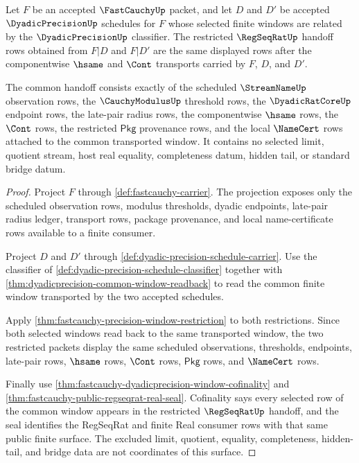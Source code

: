 \begin{theorem}
\label{thm:fastcauchy-shared-window-regseqrat-handoff}
Let $F$ be an accepted $\FastCauchyUp$ packet, and let $D$ and $D'$ be accepted
$\DyadicPrecisionUp$ schedules for $F$ whose selected finite windows are
related by the $\DyadicPrecisionUp$ classifier. The restricted
$\RegSeqRatUp$ handoff rows obtained from $F|D$ and $F|D'$ are the same
displayed rows after the componentwise $\hsame$ and $\Cont$ transports carried
by $F$, $D$, and $D'$.

The common handoff consists exactly of the scheduled $\StreamNameUp$
observation rows, the $\CauchyModulusUp$ threshold rows, the
$\DyadicRatCoreUp$ endpoint rows, the late-pair radius rows, the componentwise
$\hsame$ rows, the $\Cont$ rows, the restricted $\mathsf{Pkg}$ provenance
rows, and the local $\NameCert$ rows attached to the common transported window.
It contains no selected limit, quotient stream, host real equality,
completeness datum, hidden tail, or standard bridge datum.
\end{theorem}
\begin{proof}
Project $F$ through \autoref{def:fastcauchy-carrier}. The projection exposes
only the scheduled observation rows, modulus thresholds, dyadic endpoints,
late-pair radius ledger, transport rows, package provenance, and local
name-certificate rows available to a finite consumer.

Project $D$ and $D'$ through
\autoref{def:dyadic-precision-schedule-carrier}. Use the classifier of
\autoref{def:dyadic-precision-schedule-classifier} together with
\autoref{thm:dyadicprecision-common-window-readback} to read the common finite
window transported by the two accepted schedules.

Apply \autoref{thm:fastcauchy-precision-window-restriction} to both
restrictions. Since both selected windows read back to the same transported
window, the two restricted packets display the same scheduled observations,
thresholds, endpoints, late-pair rows, $\hsame$ rows, $\Cont$ rows,
$\mathsf{Pkg}$ rows, and $\NameCert$ rows.

Finally use
\autoref{thm:fastcauchy-dyadicprecision-window-cofinality} and
\autoref{thm:fastcauchy-public-regseqrat-real-seal}. Cofinality says every
selected row of the common window appears in the restricted $\RegSeqRatUp$
handoff, and the seal identifies the RegSeqRat and finite Real consumer rows
with that same public finite surface. The excluded limit, quotient, equality,
completeness, hidden-tail, and bridge data are not coordinates of this surface.
\end{proof}

